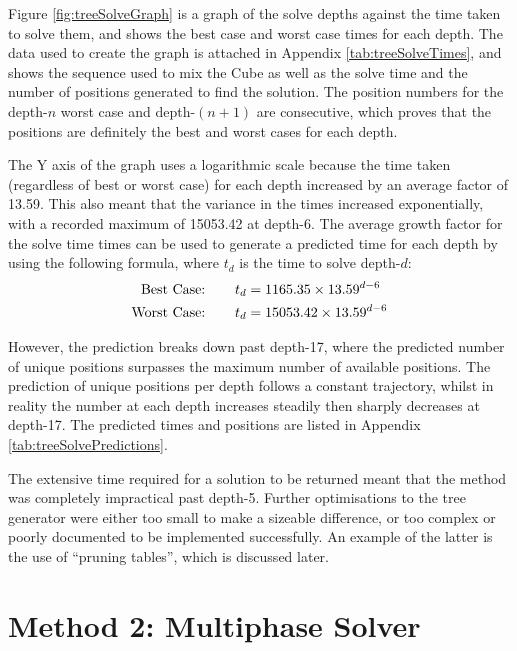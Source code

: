 \documentclass{report}
\newcommand{\depth}[1]{depth-#1}
\begin{document}
    Figure \ref{fig:treeSolveGraph} is a graph of the solve depths against the time taken to solve them, and shows the best case and worst case times for each depth. The data used to create the graph is attached in Appendix \ref{tab:treeSolveTimes}, and shows the sequence used to mix the Cube as well as the solve time and the number of positions generated to find the solution. The position numbers for the \depth{$n$} worst case and \depth{$(n+1)$} are consecutive, which proves that the positions are definitely the best and worst cases for each depth.
    
    The Y axis of the graph uses a logarithmic scale because the time taken (regardless of best or worst case) for each depth increased by an average factor of 13.59. This also meant that the variance in the times increased exponentially, with a recorded maximum of 15053.42 at \depth{6}. The average growth factor for the solve time times can be used to generate a predicted time for each depth by using the following formula, where $t_d$ is the time to solve \depth{$d$}:
   	\begin{align*}
   	\text{Best Case:}\hspace{7.5mm} 	&	t_d = 1165.35 \times 13.59^{d-6} \\
	\text{Worst Case:}\hspace{7.5mm}	&	t_d = 15053.42 \times 13.59^{d-6}
   	\end{align*}
   	
    However, the prediction breaks down past \depth{17}, where the predicted number of unique positions surpasses the maximum number of available positions. The prediction of unique positions per depth follows a constant trajectory, whilst in reality the number at each depth increases steadily then sharply decreases at \depth{17}. The predicted times and positions are listed in Appendix \ref{tab:treeSolvePredictions}.
    
    The extensive time required for a solution to be returned meant that the method was completely impractical past \depth{5}. Further optimisations to the tree generator were either too small to make a sizeable difference, or too complex or poorly documented to be implemented successfully. An example of the latter is the use of \enquote{pruning tables}, which is discussed later.
    
	\section{Method 2: Multiphase Solver}
	
\end{document}
